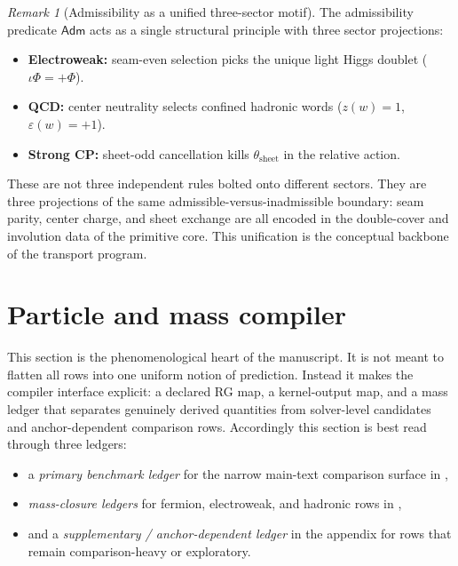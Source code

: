 \documentclass[11pt,a4paper]{article}
\theoremstyle{definition}
\theoremstyle{remark}
\newtheorem*{remark}{Remark}
\newcommand{\inv}{\iota}
\begin{document}
\begin{remark}[Admissibility as a unified three-sector motif]
The admissibility predicate $\mathsf{Adm}$ acts as a single structural principle with three sector projections:
\begin{itemize}[leftmargin=1.5em, topsep=3pt, itemsep=2pt]
    \item \textbf{Electroweak:} seam-even selection picks the unique light Higgs doublet ($\inv\Phi=+\Phi$).
    \item \textbf{QCD:} center neutrality selects confined hadronic words ($z(w)=1$, $\varepsilon(w)=+1$).
    \item \textbf{Strong CP:} sheet-odd cancellation kills $\theta_{\mathrm{sheet}}$ in the relative action.
\end{itemize}
These are not three independent rules bolted onto different sectors. They are three projections of the same admissible-versus-inadmissible boundary: seam parity, center charge, and sheet exchange are all encoded in the double-cover and involution data of the primitive core. This unification is the conceptual backbone of the transport program.
\end{remark}

\section{Particle and mass compiler}

This section is the phenomenological heart of the manuscript. It is not meant to flatten all rows into one uniform notion of prediction. Instead it makes the compiler interface explicit: a declared RG map, a kernel-output map, and a mass ledger that separates genuinely derived quantities from solver-level candidates and anchor-dependent comparison rows.
Accordingly this section is best read through three ledgers:
\begin{itemize}[leftmargin=1.5em, topsep=3pt, itemsep=2pt]
    \item a \emph{primary benchmark ledger} for the narrow main-text comparison surface in ,
    \item \emph{mass-closure ledgers} for fermion, electroweak, and hadronic rows in ,
    \item and a \emph{supplementary / anchor-dependent ledger} in the appendix for rows that remain comparison-heavy or exploratory.
\end{itemize}
\end{document}
